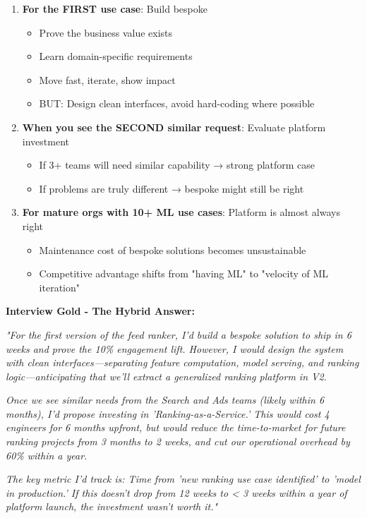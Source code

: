 \documentclass[10pt]{article}
\begin{document}
\begin{enumerate}
\item \textbf{For the FIRST use case}: Build bespoke
\begin{itemize}
\item Prove the business value exists
\item Learn domain-specific requirements
\item Move fast, iterate, show impact
\item BUT: Design clean interfaces, avoid hard-coding where possible
\end{itemize}

\item \textbf{When you see the SECOND similar request}: Evaluate platform investment
\begin{itemize}
\item If 3+ teams will need similar capability → strong platform case
\item If problems are truly different → bespoke might still be right
\end{itemize}

\item \textbf{For mature orgs with 10+ ML use cases}: Platform is almost always right
\begin{itemize}
\item Maintenance cost of bespoke solutions becomes unsustainable
\item Competitive advantage shifts from "having ML" to "velocity of ML iteration"
\end{itemize}
\end{enumerate}

\textbf{Interview Gold - The Hybrid Answer:}

\textit{"For the first version of the feed ranker, I'd build a bespoke solution to ship in 6 weeks and prove the 10\% engagement lift. However, I would design the system with clean interfaces—separating feature computation, model serving, and ranking logic—anticipating that we'll extract a generalized ranking platform in V2.}

\textit{Once we see similar needs from the Search and Ads teams (likely within 6 months), I'd propose investing in 'Ranking-as-a-Service.' This would cost 4 engineers for 6 months upfront, but would reduce the time-to-market for future ranking projects from 3 months to 2 weeks, and cut our operational overhead by 60\% within a year.}

\textit{The key metric I'd track is: Time from 'new ranking use case identified' to 'model in production.' If this doesn't drop from 12 weeks to < 3 weeks within a year of platform launch, the investment wasn't worth it."}
\end{document}

